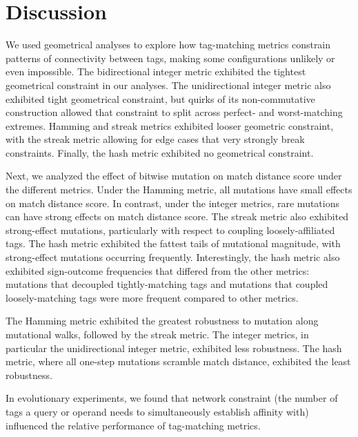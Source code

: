 \section{Discussion}


% 
We used geometrical analyses to explore how tag-matching metrics constrain patterns of connectivity between tags, making some configurations unlikely or even impossible.
The bidirectional integer metric exhibited the tightest geometrical constraint in our analyses.
The unidirectional integer metric also exhibited tight geometrical constraint, but quirks of its non-commutative construction allowed that constraint to split across perfect- and worst-matching extremes.
Hamming and streak metrics exhibited looser geometric constraint, with the streak metric allowing for edge cases that very strongly break constraints.
Finally, the hash metric exhibited no geometrical constraint.

Next, we analyzed the effect of bitwise mutation on match distance score under the different metrics.
Under the Hamming metric, all mutations have small effects on match distance score.
In contrast, under the integer metrics, rare mutations can have strong effects on match distance score.
The streak metric also exhibited strong-effect mutations, particularly with respect to coupling loosely-affiliated tags.
The hash metric exhibited the fattest tails of mutational magnitude, with strong-effect mutations occurring frequently.
Interestingly, the hash metric also exhibited sign-outcome frequencies that differed from the other metrics: mutations that decoupled tightly-matching tags and mutations that coupled loosely-matching tags were more frequent compared to other metrics.

The Hamming metric exhibited the greatest robustness to mutation along mutational walks, followed by the streak metric.
The integer metrics, in particular the unidirectional integer metric, exhibited less robustness.
The hash metric, where all one-step mutations scramble match distance, exhibited the least robustness.

In evolutionary experiments, we found that network constraint (the number of tags a query or operand needs to simultaneously establish affinity with) influenced the relative performance of tag-matching metrics.

